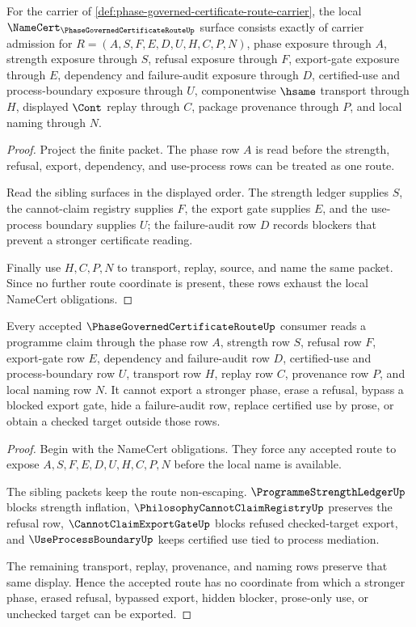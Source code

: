 \begin{theorem}
\label{thm:phase-governed-certificate-route-namecert-obligations}
For the carrier of \autoref{def:phase-governed-certificate-route-carrier}, the local $\NameCert_{\PhaseGovernedCertificateRouteUp}$ surface consists exactly of carrier admission for $R=(A,S,F,E,D,U,H,C,P,N)$, phase exposure through $A$, strength exposure through $S$, refusal exposure through $F$, export-gate exposure through $E$, dependency and failure-audit exposure through $D$, certified-use and process-boundary exposure through $U$, componentwise $\hsame$ transport through $H$, displayed $\Cont$ replay through $C$, package provenance through $P$, and local naming through $N$.
\end{theorem}
\begin{proof}
Project the finite packet. The phase row $A$ is read before the strength, refusal, export, dependency, and use-process rows can be treated as one route.

Read the sibling surfaces in the displayed order. The strength ledger supplies $S$, the cannot-claim registry supplies $F$, the export gate supplies $E$, and the use-process boundary supplies $U$; the failure-audit row $D$ records blockers that prevent a stronger certificate reading.

Finally use $H,C,P,N$ to transport, replay, source, and name the same packet. Since no further route coordinate is present, these rows exhaust the local NameCert obligations.
\end{proof}

\begin{theorem}
\label{thm:phase-governed-certificate-route-nonescape}
Every accepted $\PhaseGovernedCertificateRouteUp$ consumer reads a programme claim through the phase row $A$, strength row $S$, refusal row $F$, export-gate row $E$, dependency and failure-audit row $D$, certified-use and process-boundary row $U$, transport row $H$, replay row $C$, provenance row $P$, and local naming row $N$. It cannot export a stronger phase, erase a refusal, bypass a blocked export gate, hide a failure-audit row, replace certified use by prose, or obtain a checked target outside those rows.
\end{theorem}
\begin{proof}
Begin with the NameCert obligations. They force any accepted route to expose $A,S,F,E,D,U,H,C,P,N$ before the local name is available.

The sibling packets keep the route non-escaping. $\ProgrammeStrengthLedgerUp$ blocks strength inflation, $\PhilosophyCannotClaimRegistryUp$ preserves the refusal row, $\CannotClaimExportGateUp$ blocks refused checked-target export, and $\UseProcessBoundaryUp$ keeps certified use tied to process mediation.

The remaining transport, replay, provenance, and naming rows preserve that same display. Hence the accepted route has no coordinate from which a stronger phase, erased refusal, bypassed export, hidden blocker, prose-only use, or unchecked target can be exported.
\end{proof}

